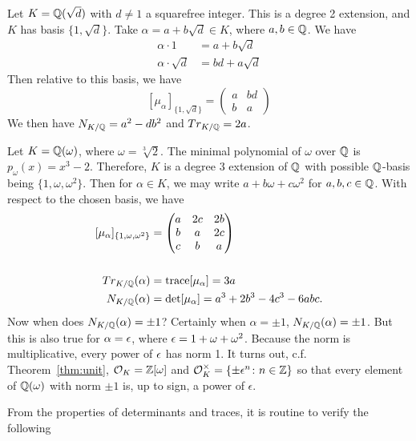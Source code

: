 \begin{ex} \label{ex:norm_trace_ex}
Let $K= \mathbb{Q}(\sqrt{d})$ with $d \neq 1$ a squarefree integer. This is a degree 2 extension, and $K$ has basis $\{ 1, \sqrt{d}\}$. Take $\alpha= a + b\sqrt{d} \in K$, where $a, b \in \mathbb{Q}$. We have
	\[
	\begin{split}
	\alpha \cdot 1&= a+b\sqrt{d} \\
	\alpha \cdot \sqrt{d}&= bd+a\sqrt{d}
	\end{split}
	\]
Then relative to this basis, we have
	\[
	[\mu_\alpha]_{\{1,\sqrt{d}\}}= \begin{pmatrix} a & bd \\ b & a \end{pmatrix}
	\]
We then have $N_{K/\mathbb{Q}}= a^2 - db^2$ and $Tr_{K/\mathbb{Q}}=2a$. \xqed \pskip
\end{ex}


\begin{ex} \label{ex:norm_trace_powerex}
Let $K= \mathbb{Q}(\omega)$, where $\omega= \sqrt[3]{2}$. The minimal polynomial of $\omega$ over $\mathbb{Q}$ is $p_\omega(x)= x^3 - 2$. Therefore, $K$ is a degree 3 extension of $\mathbb{Q}$ with possible $\mathbb{Q}$-basis being $\{ 1, \omega, \omega^2 \}$. Then for $\alpha \in K$, we may write $a + b\omega + c\omega^2$ for $a, b, c \in \mathbb{Q}$. With respect to the chosen basis, we have
	\[
	\begin{split}
	[\mu_\alpha]_{\{1,\omega, \omega^2\}}&= \begin{pmatrix} a & 2c & 2b \\ b & a & 2c \\ c & b & a \end{pmatrix} \\ \\
	Tr_{K/\mathbb{Q}}(\alpha)&= \operatorname{trace}[\mu_\alpha]= 3a \\
	N_{K/\mathbb{Q}}(\alpha)&= \det[\mu_\alpha]= a^3 + 2b^3 - 4c^3 - 6abc.
	\end{split}
	\]
Now when does $N_{K/\mathbb{Q}}(\alpha) =\pm 1$? Certainly when $\alpha= \pm 1$, $N_{K/\mathbb{Q}}(\alpha)= \pm 1$. But this is also true for $\alpha= \epsilon$, where $\epsilon= 1 + \omega + \omega^2$. Because the norm is multiplicative, every power of $\epsilon$ has norm 1. It turns out, c.f. Theorem~\ref{thm:unit}, $\mathcal{O}_K= \mathbb{Z}[\omega]$ and $\mathcal{O}_K^\times= \{ \pm \epsilon^n \colon n \in \mathbb{Z} \}$ so that every element of $\mathbb{Q}(\omega)$ with norm $\pm 1$ is, up to sign, a power of $\epsilon$. \xqed \pskip
\end{ex}


From the properties of determinants and traces, it is routine to verify the following



